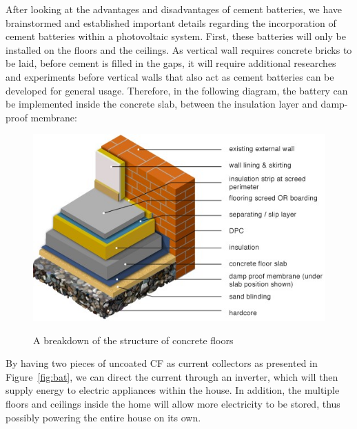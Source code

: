 After looking at the advantages and disadvantages of cement batteries, we have brainstormed and established important details regarding the incorporation of cement batteries within a photovoltaic system. First, these batteries will only be installed on the floors and the ceilings. As vertical wall requires concrete bricks to be laid, before cement is filled in the gaps, it will require additional researches and experiments before vertical walls that also act as cement batteries can be developed for general usage. Therefore, in the following diagram, the battery can be implemented inside the concrete slab, between the insulation layer and damp-proof membrane:
\begin{figure}[H]
\centering
\includegraphics[scale=0.75]{C}
\caption{A breakdown of the structure of concrete floors}\cite{property:floor}
\end{figure}
By having two pieces of uncoated CF as current collectors as presented in Figure~\ref{fig:bat}, we can direct the current through an inverter, which will then supply energy to electric appliances within the house. In addition, the multiple floors and ceilings inside the home will allow more electricity to be stored, thus possibly powering the entire house on its own.